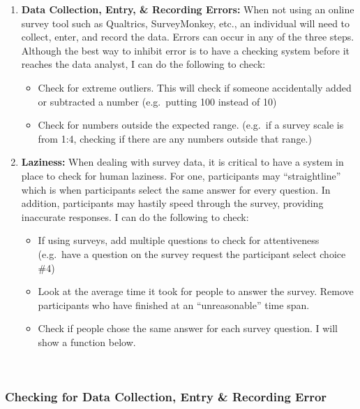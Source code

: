 \documentclass[
]{article}
\providecommand{\tightlist}{%
  \setlength{\itemsep}{0pt}\setlength{\parskip}{0pt}}
\begin{document}
\begin{enumerate}
\def\labelenumi{\arabic{enumi}.}
\tightlist
\item
  \textbf{Data Collection, Entry, \& Recording Errors:} When not using
  an online survey tool such as Qualtrics, SurveyMonkey, etc., an
  individual will need to collect, enter, and record the data. Errors
  can occur in any of the three steps. Although the best way to inhibit
  error is to have a checking system before it reaches the data analyst,
  I can do the following to check:

  \begin{itemize}
  \tightlist
  \item
    Check for extreme outliers. This will check if someone accidentally
    added or subtracted a number (e.g.~putting 100 instead of 10)
  \item
    Check for numbers outside the expected range. (e.g.~if a survey
    scale is from 1:4, checking if there are any numbers outside that
    range.)
  \end{itemize}
\item
  \textbf{Laziness:} When dealing with survey data, it is critical to
  have a system in place to check for human laziness. For one,
  participants may ``straightline'' which is when participants select
  the same answer for every question. In addition, participants may
  hastily speed through the survey, providing inaccurate responses. I
  can do the following to check:

  \begin{itemize}
  \tightlist
  \item
    If using surveys, add multiple questions to check for attentiveness
    (e.g.~have a question on the survey request the participant select
    choice \#4)
  \item
    Look at the average time it took for people to answer the survey.
    Remove participants who have finished at an ``unreasonable'' time
    span.
  \item
    Check if people chose the same answer for each survey question. I
    will show a function below.
  \end{itemize}
\end{enumerate}

~ ~

\hypertarget{checking-for-data-collection-entry-recording-error}{%
\subsubsection{Checking for Data Collection, Entry \& Recording
Error}\label{checking-for-data-collection-entry-recording-error}}
\end{document}
